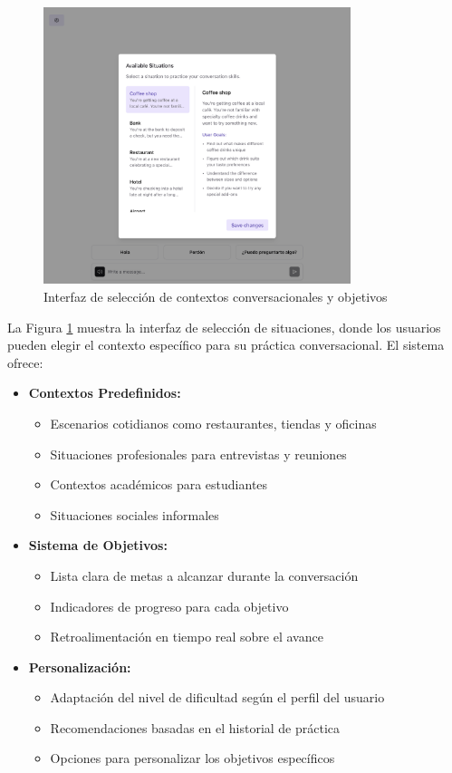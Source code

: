 \begin{figure}[H]
    \centering
    \includegraphics[width=0.8\textwidth]{figuras/screenshots/situation-picker.png}
    \caption{Interfaz de selección de contextos conversacionales y objetivos}
    \label{fig:situation-picker}
\end{figure}

La Figura \ref{fig:situation-picker} muestra la interfaz de selección de situaciones, donde los usuarios pueden elegir el contexto específico para su práctica conversacional. El sistema ofrece:
\begin{itemize}
    \item \textbf{Contextos Predefinidos:}
    \begin{itemize}
        \item Escenarios cotidianos como restaurantes, tiendas y oficinas
        \item Situaciones profesionales para entrevistas y reuniones
        \item Contextos académicos para estudiantes
        \item Situaciones sociales informales
    \end{itemize}
    
    \item \textbf{Sistema de Objetivos:}
    \begin{itemize}
        \item Lista clara de metas a alcanzar durante la conversación
        \item Indicadores de progreso para cada objetivo
        \item Retroalimentación en tiempo real sobre el avance
    \end{itemize}
    
    \item \textbf{Personalización:}
    \begin{itemize}
        \item Adaptación del nivel de dificultad según el perfil del usuario
        \item Recomendaciones basadas en el historial de práctica
        \item Opciones para personalizar los objetivos específicos
    \end{itemize}
\end{itemize}

